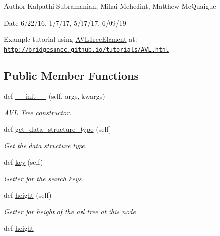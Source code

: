 \begin{DoxyAuthor}{Author}
Kalpathi Subramanian, Mihai Mehedint, Matthew Mc\+Quaigue
\end{DoxyAuthor}
\begin{DoxyDate}{Date}
6/22/16, 1/7/17, 5/17/17, 6/09/19
\end{DoxyDate}
Example tutorial using \mbox{\hyperlink{classbridges_1_1avl__tree__element_1_1_a_v_l_tree_element}{A\+V\+L\+Tree\+Element}} at\+: \href{http://bridgesuncc.github.io/tutorials/AVL.html}{\tt http\+://bridgesuncc.\+github.\+io/tutorials/\+A\+V\+L.\+html} \subsection*{Public Member Functions}
\begin{DoxyCompactItemize}
\item 
def \mbox{\hyperlink{classbridges_1_1avl__tree__element_1_1_a_v_l_tree_element_a1b3255d91449ada8e7347bd78f166d84}{\+\_\+\+\_\+init\+\_\+\+\_\+}} (self, args, kwargs)
\begin{DoxyCompactList}\small\item\em A\+VL Tree constructor. \end{DoxyCompactList}\item 
def \mbox{\hyperlink{classbridges_1_1avl__tree__element_1_1_a_v_l_tree_element_a550eaee1c1de211c69a2cfc6d89544fe}{get\+\_\+data\+\_\+structure\+\_\+type}} (self)
\begin{DoxyCompactList}\small\item\em Get the data structure type. \end{DoxyCompactList}\item 
def \mbox{\hyperlink{classbridges_1_1avl__tree__element_1_1_a_v_l_tree_element_aa98417f116a2fa96bb4fd57a009a8517}{key}} (self)
\begin{DoxyCompactList}\small\item\em Getter for the search keys. \end{DoxyCompactList}\item 
def \mbox{\hyperlink{classbridges_1_1avl__tree__element_1_1_a_v_l_tree_element_ac262e026e103fc407f585dfc4dcfab9f}{height}} (self)
\begin{DoxyCompactList}\small\item\em Getter for height of the avl tree at this node. \end{DoxyCompactList}\item 
def \mbox{\hyperlink{classbridges_1_1avl__tree__element_1_1_a_v_l_tree_element_a0ee04b3b15bbb37562e15fd882f1b0cd}{height}}

\end{DoxyCompactItemize}
